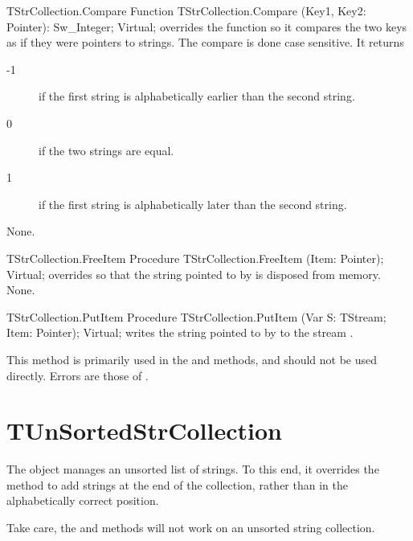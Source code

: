 \begin{function}{TStrCollection.Compare}
\Declaration
Function TStrCollection.Compare (Key1, Key2: Pointer): Sw\_Integer; Virtual;
\Description
{} overrides the  function so it compares 
the two keys as if they were pointers to strings. The compare is done case
sensitive. It returns
\begin{description}
\item[-1] if the first string is alphabetically earlier  than the second
string.
\item[0] if the two strings are equal.
\item[1] if the first string is alphabetically later than the second string.
\end{description}
\Errors
None.
\SeeAlso
{}
\end{function}



\begin{procedure}{TStrCollection.FreeItem}
\Declaration
Procedure TStrCollection.FreeItem (Item: Pointer); Virtual;
\Description
{} overrides  so that the string pointed
to by  is disposed from memory.
\Errors
None.
\SeeAlso
{}
\end{procedure}

\begin{procedure}{TStrCollection.PutItem}
\Declaration
Procedure TStrCollection.PutItem (Var S: TStream; Item: Pointer); Virtual;
\Description
{} writes the string pointed to by  to the stream
. 

This method is primarily used in the  and  methods, 
and should not be used directly.
\Errors
Errors are those of .
\SeeAlso
{}
\end{procedure}

\section{TUnSortedStrCollection}
\label{se:TUnSortedStrCollection}

The  object manages an unsorted list of strings.
To this end, it overrides the  method to add
strings at the end of the collection, rather than in the alphabetically
correct position.

Take care, the  and
 methods will not work on an unsorted
string collection.

